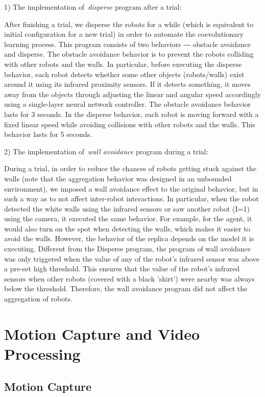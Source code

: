 1) The implementation of~\textit{disperse} program after a trial:

After finishing a trial, we disperse the robots for a while (which is equivalent to initial configuration for a new trial) in order to automate the coevolutionary learning process. This program consists of two behaviors ― obstacle avoidance and disperse. The obstacle avoidance behavior is to prevent the robots colliding with other robots and the walls. In particular, before executing the disperse behavior, each robot detects whether some other objects (robots/walls) exist around it using its infrared proximity sensors. If it detects something, it moves away from the objects through adjusting the linear and angular speed accordingly using a single-layer neural network controller. The obstacle avoidance behavior lasts for 3 seconds. In the disperse behavior, each robot is moving forward with a fixed linear speed while avoiding collisions with other robots and the walls. This behavior lasts for 5 seconds.

2) The implementation of~\textit{wall avoidance} program during a trial:

During a trial, in order to reduce the chances of robots getting stuck against the walls (note that the aggregation behavior was designed in an unbounded environment), we imposed a wall avoidance effect to the original behavior, but in such a way as to not affect inter-robot interactions. In particular, when the robot detected the white walls using the infrared sensors or saw another robot (I=1) using the camera, it executed the same behavior. For example, for the agent, it would also turn on the spot when detecting the walls, which makes it easier to avoid the walls. However, the behavior of the replica depends on the model it is executing. Different from the Disperse program, the program of wall avoidance was only triggered when the value of any of the robot's infrared sensor was above a pre-set high threshold. This ensures that the value of the robot's infrared sensors when other robots (covered with a black 'skirt') were nearby was always below the threshold. Therefore, the wall avoidance program did not affect the aggregation of robots.

\section{Motion Capture and Video Processing}\label{motion_capture_and_video_processing_swarm_physical}

\subsection{Motion Capture}\label{sec:motion_capture_swarm_physical}

